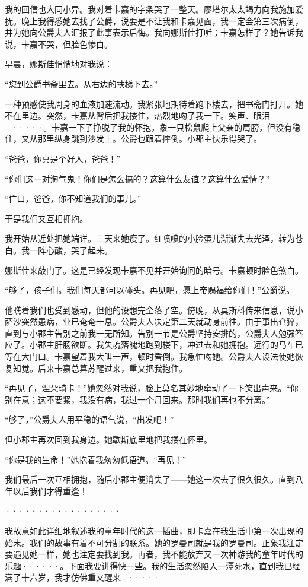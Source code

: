 \documentclass[12pt, UTF8]{ctexbook}
\begin{document}
\par 我的回信也大同小异。我对着卡嘉的字条哭了一整天。廖塔尔太太竭力向我施加爱抚。晚上我得悉她去找了公爵，说要是不让我和卡嘉见面，我一定会第三次病倒，并为她向公爵夫人汇报了此事表示后悔。我向娜斯佳打听；卡嘉怎样了？她告诉我说，卡嘉不哭，但脸色惨白。
\par 早晨，娜斯佳悄悄地对我说：
\par “您到公爵书斋里去。从右边的扶梯下去。”
\par 一种预感使我周身的血液加速流动。我紧张地期待着跑下楼去，把书斋门打开。她不在里边。突然，卡嘉从背后把我搂住，热烈地吻了我一下。笑声、眼泪······。卡嘉一下子挣脱了我的怀抱，象一只松鼠爬上父亲的肩膀，但没有稳住，又从那里纵身跳到沙发上。公爵也跟着摔倒。小郡主快乐得哭了。
\par “爸爸，你真是个好人，爸爸！”
\par “你们这一对淘气鬼！你们是怎么搞的？这算什么友谊？这算什么爱情？”
\par “住口，爸爸，你不知道我们的事儿。”
\par 于是我们又互相拥抱。
\par 我开始从近处把她端详。三天来她瘦了。红喷喷的小脸蛋儿渐渐失去光泽，转为苍白。我一阵心酸，哭了起来。
\par 娜斯佳来敲门了。这是已经发现卡嘉不见并开始询问的暗号。卡嘉顿时脸色煞白。
\par “够了，孩子们。我们每天都可以碰头。再见吧，愿上帝赐福给你们！”公爵说。
\par 他瞧着我们也受到感动，但他的设想完全落了空。傍晚，从莫斯科传来信息，说小萨沙突然患病，业已奄奄一息。公爵夫人决定第二天就动身前往。由于事出仓猝，直到与小郡主告别之前我一无所知。告别一节是公爵坚持安排的，公爵夫人勉强答应了。小郡主肝肠欲断。我失魂落魄地跑到楼下，冲过去和她拥抱。远行的马车已等在大门口。卡嘉望着我大叫一声，顿时昏倒。我急忙吻她。公爵夫人设法使她恢复知觉。后来卡嘉总算苏醒过来，重又把我抱住。
\par “再见了，涅朵琦卡！”她忽然对我说，脸上莫名其妙地牵动了一下笑出声来。“你别在意；这不要紧，我没有病，我过一个月回来。那时我们再也不分离。”
\par “够了，”公爵夫人用平稳的语气说，“出发吧！”
\par 但小郡主再次回到我身边。她歇斯底里地把我搂在怀里。
\par “你是我的生命！”她抱着我匆匆低语道。“再见！”
\par 我们最后一次互相拥抱，随后小郡主便消失了——她这一次去了很久很久。直到八年以后我们才得重逢！
\par ··················
\par 我故意如此详细地叙述我的童年时代的这一插曲，即卡嘉在我生活中第一次出现的始末。我们的故事有着不可分割的联系。她的罗曼司就是我的罗曼司。正象我注定要遇见她一样，她也注定要找到我。再者，我不能放弃又一次神游我的童年时代的乐趣······。下面我要讲得快一些。我的生活忽然陷入一潭死水，直到我已经满了十六岁，我才仿佛重又醒来······
\end{document}
